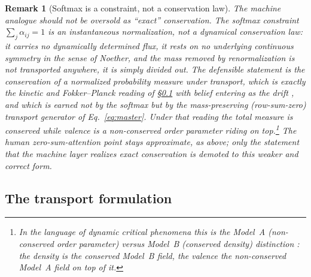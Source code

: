\documentclass[11pt]{article}
\newtheorem{remark}{Remark}
\begin{document}
\begin{remark}[Softmax is a constraint, not a conservation law]
The machine analogue should not be oversold as ``exact'' conservation. The softmax constraint $\sum_j \alpha_{ij}=1$ is an \emph{instantaneous} normalization, not a dynamical conservation law: it carries no dynamically determined flux, it rests on no underlying continuous symmetry in the sense of Noether, and the mass removed by renormalization is not transported anywhere, it is simply divided out. The defensible statement is the conservation of a \emph{normalized probability measure under transport}, which is exactly the kinetic and Fokker--Planck reading of \S\ref{sec:transport} with belief entering as the drift \cite{toscani2006}, and which is earned not by the softmax but by the mass-preserving (row-sum-zero) transport generator of Eq.~\eqref{eq:master}. Under that reading the total measure is conserved while \emph{valence} is a non-conserved order parameter riding on top.\footnote{In the language of dynamic critical phenomena this is the Model~A (non-conserved order parameter) versus Model~B (conserved density) distinction \cite{hohenberg1977,castellano2009}: the density is the conserved Model~B field, the valence the non-conserved Model~A field on top of it.} The human zero-sum-attention point stays approximate, as above; only the statement that the machine layer realizes \emph{exact} conservation is demoted to this weaker and correct form.
\end{remark}

\subsection{The transport formulation}
\label{sec:transport}
\end{document}
